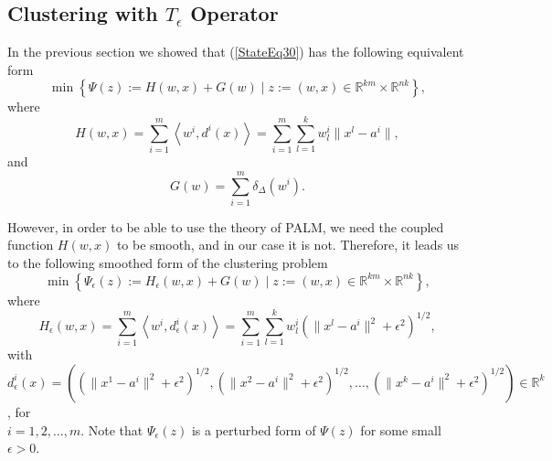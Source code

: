 \documentclass[11pt]{article}
\numberwithin{equation}{section}
\begin{document}
\subsection{Clustering with $T_{\epsilon}$ Operator}

In the previous section we showed that (\ref{StateEq30}) has the following equivalent form
\begin{equation*}
	\min \left\lbrace \Psi(z) := H(w,x) + G(w) \mid z := (w,x) \in \mathbb{R}^{km} \times \mathbb{R}^{nk} \right\rbrace ,
\end{equation*}
where 
\begin{equation*}
	H(w,x) = \sum\limits_{i=1}^{m} \left\langle w^i , d^i(x) \right\rangle
	= \sum\limits_{i=1}^{m} \sum\limits_{l=1}^{k} w^i_l \| x^l - a^i \| ,
\end{equation*}
and 
\begin{equation*}
G(w) = \sum\limits_{i=1}^{m} \delta_{\Delta}(w^i) .
\end{equation*}

However, in order to be able to use the theory of PALM, we need the coupled function $H(w,x)$ to be smooth, and in our case it is not. Therefore, it leads us to the following smoothed form of the clustering problem
\begin{equation}
	\min \left\lbrace \Psi_{\epsilon}(z) := H_{\epsilon}(w,x) + G(w) \mid z := (w,x) \in \mathbb{R}^{km} \times \mathbb{R}^{nk} \right\rbrace , \label{StateEq31}
\end{equation}
where 
\begin{equation*}
	H_{\epsilon}(w,x) = \sum\limits_{i=1}^{m} \left\langle w^i , d_{\epsilon}^i(x) \right\rangle
	= \sum\limits_{i=1}^{m} \sum\limits_{l=1}^{k} w^i_l \left( \| x^l - a^i \|^2 + {\epsilon}^2 \right)^{1/2} ,
\end{equation*}
with $d_{\epsilon}^i(x) = \left( \left( \|x^1 - a^i\|^2 + {\epsilon}^2 \right)^{1/2}, \left( \|x^2 - a^i\|^2 + {\epsilon}^2 \right)^{1/2}, \ldots , \left( \|x^k - a^i\|^2 + {\epsilon}^2 \right)^{1/2} \right) \in \mathbb{R}^k$, for \\$i=1,2, \ldots , m$. Note that $\Psi_{\epsilon}(z)$ is a perturbed form of $\Psi(z)$ for some small $\epsilon > 0$.
\end{document}
